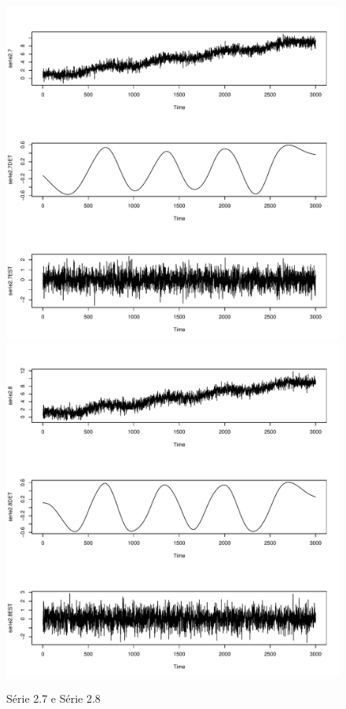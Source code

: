 \graphicspath{{imagens/}}
\begin{figure}[H]
\begin{center}
  \includegraphics[scale=0.43]{serie2_7.pdf} \quad
  \includegraphics[scale=0.43]{serie2_8.pdf}
  \caption{Série 2.7 e Série 2.8}

\end{center}
\end{figure}

